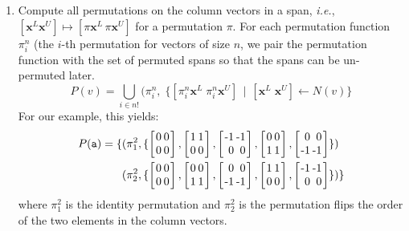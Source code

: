 \documentclass[9pt]{sigplanconf}
\theoremstyle{definition}
\newcommand{\ie}{\emph{i.e.}}
\newcommand{\vect}[1]{\textbf{#1}}
\newcommand{\vtwo}[2]{\setlength{\arraycolsep}{0em}
\left[\begin{array}{l}$#1$\\$#2$\end{array}\right]}
\newcommand{\stwo}[4]
{\setlength{\arraycolsep}{0.1em}
\left[\begin{array}{rr}$#1$ & $#3$\\$#2$ & $#4$\end{array}\right]}
\begin{document}
\begin{enumerate}

\item Compute all permutations on the column vectors in a span, \ie{},
  $[\vect{x}^L \vect{x}^U] \mapsto [\pi\vect{x}^L \, \pi\vect{x}^U]$
for a permutation $\pi$. For each permutation function $\pi^n_i$
(the $i$-th permutation for vectors of size $n$, we pair the
permutation function with the set of permuted spans so that
the spans can be un-permuted later.
%
\[
P(v) = \bigcup_{i \in n!} (\pi^n_{i} , \; \{[\pi^n_i
\vect{x}^L \; \pi^n_i\vect{x}^U] \, \mid \, [\vect{x}^L \; \vect{x}^U]
\leftarrow N(v)\}
\]
%
For our example, this yields:
%
\begin{align*}
P(\texttt{a}) =
\{&(\pi^2_1, \{ \stwo{0}{0}{0}{0},
\stwo{1}{0}{1}{0},
\stwo{-1}{0}{-1}{0},
\stwo{0}{1}{0}{1},
\stwo{0}{-1}{0}{-1} \})
\\
&(\pi^2_2, \{
 \stwo{0}{0}{0}{0},
 \stwo{0}{1}{0}{1},
 \stwo{0}{-1}{0}{-1},
 \stwo{1}{0}{1}{0},
 \stwo{-1}{0}{-1}{0}\})\}
\end{align*}
%
where $\pi^2_1$ is the identity permutation and $\pi^2_2$ is the
permutation flips the order of the two elements in the column
vectors.


\end{enumerate}
\end{document}
